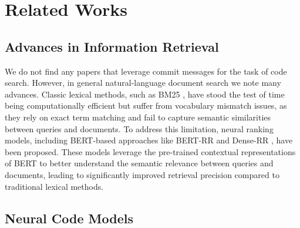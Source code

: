 \section{Related Works}
\label{lit_review}
\subsection{Advances in Information Retrieval}
We do not find any papers that leverage commit messages for the task of code search. However, in general natural-language document search we note many advances. Classic lexical methods, such as BM25 \cite{bm25}, have stood the test of time being computationally efficient but suffer from vocabulary mismatch issues, as they rely on exact term matching and fail to capture semantic similarities between queries and documents. To address this limitation, neural ranking models, including BERT-based approaches like BERT-RR \cite{bertrr} and Dense-RR \cite{denserr}, have been proposed. These models leverage the pre-trained contextual representations of BERT \cite{devlin2018bert} to better understand the semantic relevance between queries and documents, leading to significantly improved retrieval precision compared to traditional lexical methods.

\subsection{Neural Code Models}


